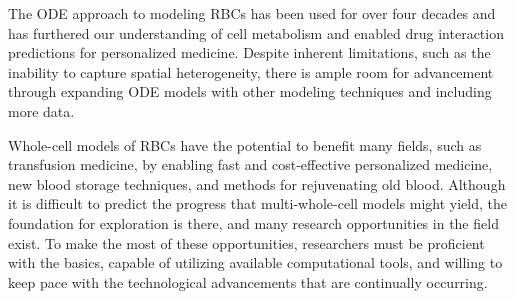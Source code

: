 \documentclass[conference]{IEEEtran}
\begin{document}
The ODE approach to modeling RBCs has been used for over four decades and has furthered our understanding of cell metabolism and enabled drug interaction predictions for personalized medicine. Despite inherent limitations, such as the inability to capture spatial heterogeneity, there is ample room for advancement through expanding ODE models with other modeling techniques and including more data. 

Whole-cell models of RBCs have the potential to benefit many fields, such as transfusion medicine, by enabling fast and cost-effective personalized medicine, new blood storage techniques, and methods for rejuvenating old blood. Although it is difficult to predict the progress that multi-whole-cell models might yield, the foundation for exploration is there, and many research opportunities in the field exist. To make the most of these opportunities, researchers must be proficient with the basics, capable of utilizing available computational tools, and willing to keep pace with the technological advancements that are continually occurring.
\end{document}
